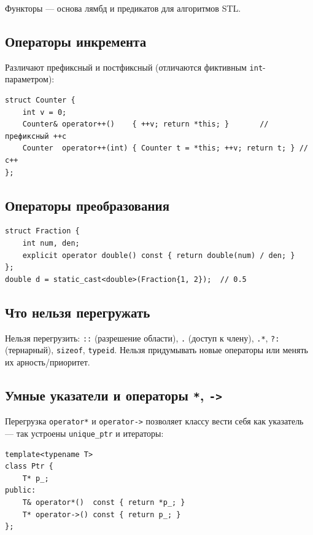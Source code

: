 Функторы --- основа лямбд и предикатов для алгоритмов STL.

\subsection{Операторы инкремента}

Различают префиксный и постфиксный (отличаются фиктивным \texttt{int}-параметром):

\begin{lstlisting}
struct Counter {
    int v = 0;
    Counter& operator++()    { ++v; return *this; }       // префиксный ++c
    Counter  operator++(int) { Counter t = *this; ++v; return t; } // c++
};
\end{lstlisting}

\subsection{Операторы преобразования}

\begin{lstlisting}
struct Fraction {
    int num, den;
    explicit operator double() const { return double(num) / den; }
};
double d = static_cast<double>(Fraction{1, 2});  // 0.5
\end{lstlisting}

\subsection{Что нельзя перегружать}

Нельзя перегрузить: \texttt{::} (разрешение области), \texttt{.} (доступ к члену),
\texttt{.*}, \texttt{?:} (тернарный), \texttt{sizeof}, \texttt{typeid}. Нельзя
придумывать новые операторы или менять их арность/приоритет.

\subsection{Умные указатели и операторы \texttt{*}, \texttt{->}}

Перегрузка \texttt{operator*} и \texttt{operator->} позволяет классу вести себя
как указатель --- так устроены \texttt{unique\_ptr} и итераторы:

\begin{lstlisting}
template<typename T>
class Ptr {
    T* p_;
public:
    T& operator*()  const { return *p_; }
    T* operator->() const { return p_; }
};
\end{lstlisting}
